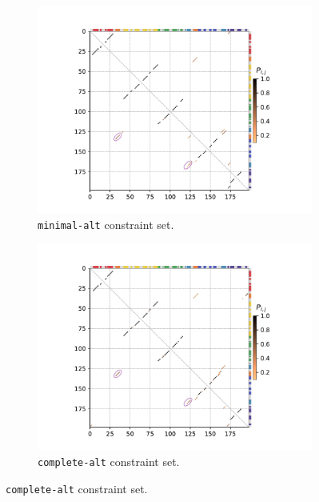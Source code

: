 \documentclass[../../master.tex]{subfiles}
\begin{document}
\begin{figure}[!ht]
	\centering
	\begin{subfigure}[t]{0.5\textwidth}
		\centering
		\includegraphics[trim=55 10 70 10, clip, width=\textwidth]{pic/results/designs/dotplots/examples/minimal-alt-rangecolor.pdf}
		\caption{\texttt{minimal-alt} constraint set.
		}\label{fig:bpp_nopseven:a}
	\end{subfigure}%
	\begin{subfigure}[t]{0.5\textwidth}
		\centering
		\includegraphics[trim=55 10 70 10, clip, width=\textwidth]{pic/results/designs/dotplots/examples/complete-alt-rangecolor.pdf}
		\caption{\texttt{complete-alt} constraint set.
		}\label{fig:bpp_nopseven:b}
	\end{subfigure}

\end{figure}
\end{document}

